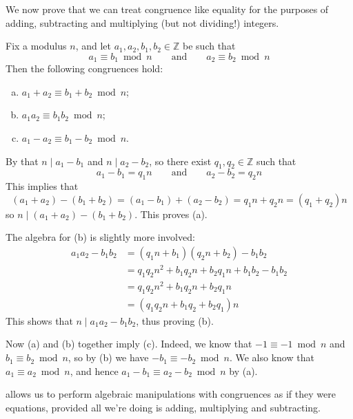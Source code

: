 We now prove that we can treat congruence like equality for the purposes of adding, subtracting and multiplying (but not dividing!) integers.

\begin{theorem}\label{thmModularArithmetic}
Fix a modulus $n$, and let $a_1,a_2,b_1,b_2 \in \mathbb{Z}$ be such that
\[ a_1 \equiv b_1 \bmod n \qquad \text{and} \qquad a_2 \equiv b_2 \bmod n \]
Then the following congruences hold:
\begin{enumerate}[(a)]
\item $a_1+a_2 \equiv b_1+b_2 \bmod n$;
\item $a_1a_2 \equiv b_1b_2 \bmod n$;
\item $a_1-a_2 \equiv b_1-b_2 \bmod n$.
\end{enumerate}
\end{theorem}
\begin{cproof} By  that $n \mid a_1-b_1$ and $n \mid a_2-b_2$, so there exist $q_1,q_2 \in \mathbb{Z}$ such that
\[ a_1-b_1 = q_1n \qquad \text{and} \qquad a_2-b_2=q_2n \]
This implies that
\[ (a_1+a_2)-(b_1+b_2) = (a_1-b_1)+(a_2-b_2) = q_1n+q_2n = (q_1+q_2)n \]
so $n \mid (a_1+a_2)-(b_1+b_2)$. This proves (a).

The algebra for (b) is slightly more involved:
\begin{align*}
a_1a_2-b_1b_2 &= (q_1n+b_1)(q_2n+b_2) - b_1b_2 \\
&= q_1q_2n^2 + b_1q_2n + b_2q_1n + b_1b_2 - b_1b_2 \\
&= q_1q_2n^2 + b_1q_2n + b_2q_1n \\
&= (q_1q_2n + b_1q_2 + b_2q_1)n
\end{align*}
This shows that $n \mid a_1a_2 - b_1b_2$, thus proving (b).

Now (a) and (b) together imply (c). Indeed, we know that $-1 \equiv -1 \bmod n$ and $b_1 \equiv b_2 \bmod n$, so by (b) we have $-b_1 \equiv -b_2 \bmod n$. We also know that $a_1 \equiv a_2 \bmod n$, and hence $a_1-b_1 \equiv a_2-b_2 \bmod n$ by (a).
\end{cproof}

 allows us to perform algebraic manipulations with congruences as if they were equations, provided all we're doing is adding, multiplying and subtracting.

